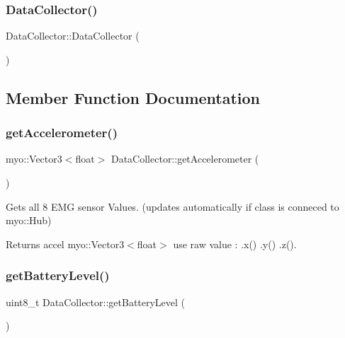 \subsubsection{\texorpdfstring{Data\+Collector()}{DataCollector()}}
{\footnotesize\ttfamily Data\+Collector\+::\+Data\+Collector (\begin{DoxyParamCaption}{ }\end{DoxyParamCaption})}



\subsection{Member Function Documentation}
\mbox{\label{class_data_collector_a1ef7a2beb37a42d4ac887fef90ac8947}} 
\subsubsection{\texorpdfstring{get\+Accelerometer()}{getAccelerometer()}}
{\footnotesize\ttfamily myo\+::\+Vector3$<$float$>$ Data\+Collector\+::get\+Accelerometer (\begin{DoxyParamCaption}{ }\end{DoxyParamCaption})\hspace{0.3cm}{\ttfamily [inline]}}



Gets all 8 E\+MG sensor Values. (updates automatically if class is conneced to myo\+::\+Hub) 

\begin{DoxyReturn}{Returns}
accel myo\+::\+Vector3$<$float$>$ use raw value \+: .x() .y() .z(). 
\end{DoxyReturn}
\mbox{\label{class_data_collector_a376b4be3194c56e25084df4097968a46}} 
\subsubsection{\texorpdfstring{get\+Battery\+Level()}{getBatteryLevel()}}
{\footnotesize\ttfamily uint8\+\_\+t Data\+Collector\+::get\+Battery\+Level (\begin{DoxyParamCaption}{ }\end{DoxyParamCaption})\hspace{0.3cm}{\ttfamily [inline]}}



